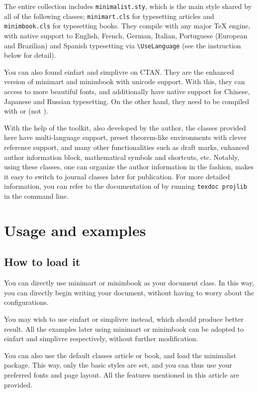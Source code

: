 \documentclass[classical, simple name]{minimart}
\newenvironment{tip}[1][Tip]
  {%
    \LocallyStopLineNumbers%
    \begin{tcolorbox}[breakable,
        enhanced,
        width = \textwidth,
        colback = paper, colbacktitle = paper,
        colframe = gray!50, boxrule=0.2mm,
        coltitle = black,
        fonttitle = \sffamily,
        attach boxed title to top left = {yshift=-\tcboxedtitleheight/2, xshift=.5cm},
        boxed title style = {boxrule=0pt, colframe=paper},
        before skip = 3mm,
        after skip = 3mm,
        top = 2.5mm,
        bottom = 1.5mm,
        title={\scshape\sffamily #1}]%
  }
  {%
    \end{tcolorbox}%
    \ResumeLineNumbers%
  }
\providecommand{\minimalist}{\textsf{minimalist}}
\providecommand{\minimart}{\textsf{minimart}}
\providecommand{\minimbook}{\textsf{minimbook}}
\providecommand{\einfart}{\textsf{einfart}}
\providecommand{\simplivre}{\textsf{simplivre}}
\let\LevelOneTitle\section
\let\LevelTwoTitle\subsection
\begin{document}
The entire collection includes \verb|minimalist.sty|, which is the main style shared by all of the following classes; \verb|minimart.cls| for typesetting articles and \verb|minimbook.cls| for typesetting books. They compile with any major \TeX{} engine, with native support to English, French, German, Italian, Portuguese (European and Brazilian) and Spanish typesetting via \lstinline|\UseLanguage| (see the instruction below for detail).

You can also found \einfart{} and \simplivre{} on CTAN. They are the enhanced version of \minimart{} and \minimbook{} with unicode support. With this, they can access to more beautiful fonts, and additionally have native support for Chinese, Japanese and Russian typesetting. On the other hand, they need to be compiled with  or  (not ).

With the help of the \ProjLib{} toolkit, also developed by the author, the classes provided here have multi-language support, preset theorem-like environments with clever reference support, and many other functionalities such as draft marks, enhanced author information block, mathematical symbols and shortcuts, etc. Notably, using these classes, one can organize the author information in the \AmS{} fashion, makes it easy to switch to journal classes later for publication. For more detailed information, you can refer to the documentation of \ProjLib{} by running \lstinline|texdoc projlib| in the command line.

\LevelOneTitle{Usage and examples}

\LevelTwoTitle{How to load it}
You can directly use \minimart{} or \minimbook{} as your document class. In this way, you can directly begin writing your document, without having to worry about the configurations.


\begin{tip}
    You may wish to use \einfart{} or \simplivre{} instead, which should produce better result. All the examples later using \minimart{} or \minimbook{} can be adopted to \einfart{} and \simplivre{} respectively, without further modification.
\end{tip}

You can also use the default classes \textsf{article} or \textsf{book}, and load the \minimalist{} package. This way, only the basic styles are set, and you can thus use your preferred fonts and page layout. All the features mentioned in this article are provided.
\end{document}
